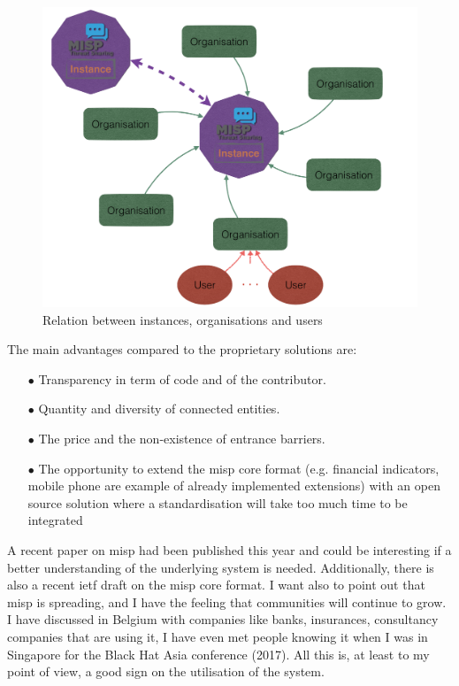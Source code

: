\documentclass{eplmastersthesis}
\begin{document}
\begin{figure}
\centering
\includegraphics[scale=0.4]{res/misp-organisations}
\caption{Relation between instances, organisations and users}
\label{misp-organisations}
\end{figure}

The main advantages compared to the proprietary solutions are:
\begin{itemize}
\item[$\bullet$] Transparency in term of code and of the contributor.
\item[$\bullet$] Quantity and diversity of connected entities.
\item[$\bullet$] The price and the non-existence of entrance barriers.
\item[$\bullet$] The opportunity to extend the \gls{misp} core format (e.g. financial indicators, mobile phone are example of already implemented extensions) with an open source solution where a standardisation will take too much time to be integrated
\end{itemize}

A recent paper on \gls{misp} \cite{wagner2016misp} had been published this year and could be interesting if a better understanding of the underlying system is needed. Additionally, there is also a recent \gls{ietf} draft on the \gls{misp} core format\cite{MispDraft}.
I want also to point out that \gls{misp} is spreading, and I have the feeling that communities will continue to grow. I have discussed in Belgium with companies like banks, insurances, consultancy companies that are using it, I have even met people knowing it when I was in Singapore for the Black Hat Asia conference (2017). All this is, at least to my point of view, a good sign on the utilisation of the system.
\end{document}
